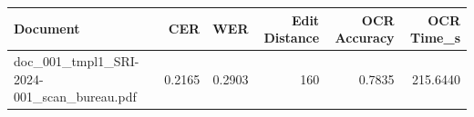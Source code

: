 \begin{tabular}{lrrrrr}
\toprule
Document & CER & WER & Edit Distance & OCR Accuracy & OCR Time_s \\
\midrule
doc_001_tmpl1_SRI-2024-001_scan_bureau.pdf & 0.2165 & 0.2903 & 160 & 0.7835 & 215.6440 \\
\bottomrule
\end{tabular}
